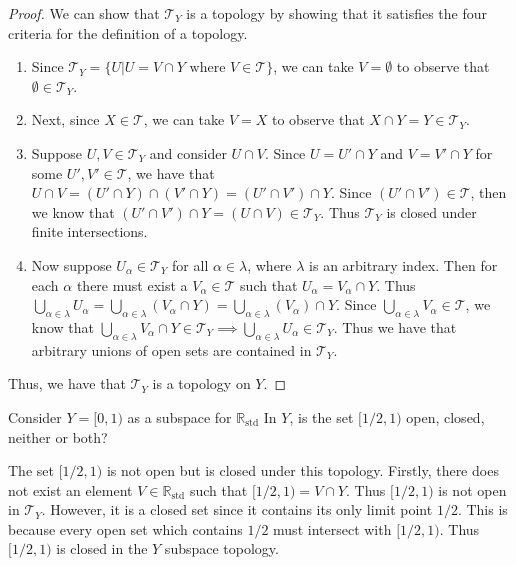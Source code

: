 \documentclass[a4paper,12pt,twoside]{hmcpset}
\begin{document}
\begin{proof}
We can show that $\mathscr{T}_Y$ is a topology by showing that it
satisfies the four criteria for the definition of a topology.
\begin{enumerate}
    \item Since $\mathscr{T}_Y = \{U | U = V \cap Y \text{ where } V \in
    \mathscr{T}\}$, we can take $V = \emptyset$ to observe that $\emptyset
    \in \mathscr{T}_Y.$

    \item Next, since $X \in \mathscr{T}$,
    we can take $V = X$ to observe that $X \cap Y = Y \in \mathscr{T}_Y.$

    \item Suppose $U, V \in \mathscr{T}_Y$ and consider $U \cap V$.
    Since $U = U' \cap Y$ and $V = V' \cap Y$ for some $U', V' \in
    \mathscr{T}$, we have that $U \cap V = (U' \cap Y) \cap (V' \cap Y) =
    (U' \cap V') \cap Y$. Since $(U' \cap V') \in \mathscr{T}$, then we
    know that $(U' \cap V') \cap Y = (U \cap V) \in \mathscr{T}_Y.$ Thus
    $\mathscr{T}_Y$ is closed under finite intersections.

    \item Now suppose $U_\alpha \in \mathscr{T}_Y$
    for all $\alpha \in \lambda$, where
    $\lambda$ is an arbitrary index. Then for each $\alpha$ there must exist a $V_\alpha \in
    \mathscr{T}$ such that $U_\alpha = V_\alpha \cap Y$. Thus
    $\bigcup\limits_{\alpha \in \lambda} U_\alpha = \bigcup\limits_{\alpha
    \in \lambda} (V_\alpha \cap Y) = \bigcup\limits_{\alpha \in \lambda}
    (V_\alpha) \cap Y $. Since $\bigcup\limits_{\alpha \in \lambda}
    V_\alpha \in \mathscr{T}$, we know that $\bigcup\limits_{\alpha
    \in \lambda} V_\alpha \cap Y \in \mathscr{T}_Y \implies
    \bigcup\limits_{\alpha \in \lambda} U_\alpha \in \mathscr{T}_Y.$ Thus we have that
    arbitrary unions of open sets are contained in $\mathscr{T}_Y.$
\end{enumerate}
Thus, we have that $\mathscr{T}_Y$ is a topology on $Y$.
\end{proof}

\begin{exercise}[Exercise 4.26]
Consider $Y = [0, 1)$ as a subspace for $\mathbb{R}_{\text{std}}$ In
$Y$, is the set $[1/2, 1)$ open, closed, neither or both? 
\end{exercise}

\begin{solution}
The set $[1/2, 1)$ is not open but is closed under this topology.
Firstly, there does not exist an element $V \in
\mathbb{R}_{\text{std}}$ such that $[1/2, 1) = V \cap Y$. Thus $[1/2, 1)$ is
not open in $\mathscr{T}_Y$. However, it is a closed set since it
contains its only limit point $1/2.$ This is because 
every open set which contains $1/2$ must
intersect with $[1/2, 1)$. Thus $[1/2, 1)$ is closed in the $Y$
subspace topology. 
\end{solution}
\end{document}

